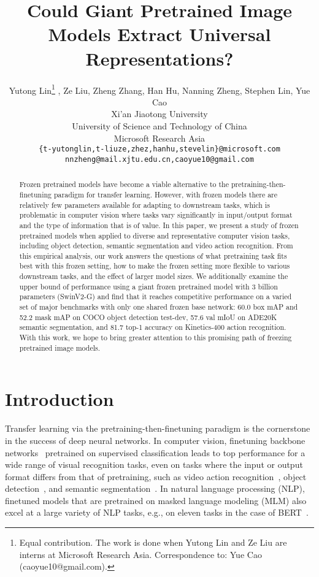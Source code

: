 \documentclass{article}
\title{Could Giant Pretrained Image Models Extract Universal Representations?}
\author{Yutong Lin\thanks{Equal contribution. The work is done when Yutong Lin and Ze Liu are interns at Microsoft Research Asia. Correspondence to: Yue Cao (caoyue10@gmail.com).}\hspace{0.4mm} , Ze Liu, Zheng Zhang, Han Hu, Nanning Zheng, Stephen Lin, Yue Cao\\
  Xi'an Jiaotong University\\
  University of Science and Technology of China\\
  Microsoft Research Asia\\
  \texttt{\{t-yutonglin,t-liuze,zhez,hanhu,stevelin\}@microsoft.com} \\
  \texttt{nnzheng@mail.xjtu.edu.cn,caoyue10@gmail.com}
}
\begin{document}
\maketitle


\begin{abstract}
Frozen pretrained models have become a viable alternative to the pretraining-then-finetuning paradigm for transfer learning. However, with frozen models there are relatively few parameters available for adapting to downstream tasks, which is problematic in computer vision where tasks vary significantly in input/output format and the type of information that is of value. In this paper, we present a study of frozen pretrained models when applied to diverse and representative computer vision tasks, including object detection, semantic segmentation and video action recognition. From this empirical analysis, our work answers the questions of what pretraining task fits best with this frozen setting, how to make the frozen setting more flexible to various downstream tasks, and the effect of larger model sizes. We additionally examine the upper bound of performance using a giant frozen pretrained model with 3 billion parameters (SwinV2-G) and find that it reaches competitive performance on a varied set of major benchmarks with only one shared frozen base network: 60.0 box mAP and 52.2 mask mAP on COCO object detection test-dev, 57.6 val mIoU on ADE20K semantic segmentation, and 81.7 top-1 accuracy on Kinetics-400 action recognition. With this work, we hope to bring greater attention to this promising path of freezing pretrained image models.
\end{abstract}

\section{Introduction}
Transfer learning via the pretraining-then-finetuning paradigm is the cornerstone in the success of deep neural networks. In computer vision, finetuning backbone networks~\cite{alexnet,he2016resnet,dosovitskiy2020vit,liu2021swin} pretrained on supervised classification leads to top performance for a wide range of visual recognition tasks, even on tasks where the input or output format differs from that of pretraining, such as video action recognition~\cite{kay2017kinetics}, object detection~\cite{lin2014coco}, and semantic segmentation~\cite{zhou2018ade}.
In natural language processing (NLP), finetuned models that are pretrained on masked language modeling (MLM) also excel at a large variety of NLP tasks, e.g., on eleven tasks in the case of BERT~\cite{devlin2018bert}.
\end{document}
